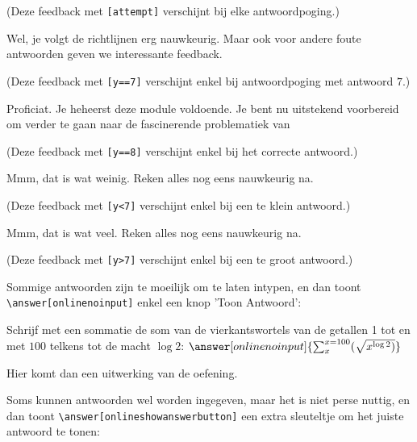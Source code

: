\documentclass{ximera}
\begin{document}
\begin{exercise}
\begin{question}
\begin{feedback}[attempt]
            (Deze feedback met \verb|[attempt]| verschijnt bij elke antwoordpoging.)   
           \end{feedback}
      
          \begin{feedback}[y==7]
            Wel, je volgt de richtlijnen erg nauwkeurig. Maar ook voor andere foute antwoorden geven we interessante feedback.
            
            (Deze feedback met \verb|[y==7]| verschijnt enkel bij antwoordpoging met antwoord $7$.)   
            
          \end{feedback}
          \begin{feedback}[y==8]
          Proficiat. Je heheerst deze module voldoende. Je bent nu uitstekend voorbereid om verder te gaan naar de fascinerende problematiek van 

          (Deze feedback met \verb|[y==8]| verschijnt enkel bij het correcte antwoord.)   

          \end{feedback}
          \begin{feedback}[y<7]
              Mmm, dat is wat weinig. Reken alles nog eens nauwkeurig na.
              
              (Deze feedback met \verb|[y<7]| verschijnt enkel bij een te klein antwoord.)   
            \end{feedback}
          \begin{feedback}[y>8]
               Mmm, dat is wat veel. Reken alles nog eens nauwkeurig na.

              (Deze feedback met \verb|[y>7]| verschijnt enkel bij een te groot antwoord.)   

           \end{feedback}
       \end{question}

	\begin{question}
		Sommige antwoorden zijn te moeilijk om te laten intypen, en dan toont \verb|\answer[onlinenoinput]| enkel een knop 'Toon Antwoord':
        
        Schrijf met een sommatie de som van de vierkantswortels van de getallen 1 tot en met $100$ telkens tot de macht $\log 2$:  $\answer[onlinenoinput]{\sum_x^{x=100}(\sqrt{x^{\log 2})}}$
        
		\begin{oplossing}
			Hier komt dan een uitwerking van de oefening.
		\end{oplossing}
	\end{question}
	\begin{question}
		Soms kunnen antwoorden wel worden ingegeven, maar het is niet perse nuttig, en dan toont  \verb|\answer[onlineshowanswerbutton]| een extra sleuteltje om het juiste antwoord te tonen:
        

\end{question}
\end{exercise}
\end{document}

